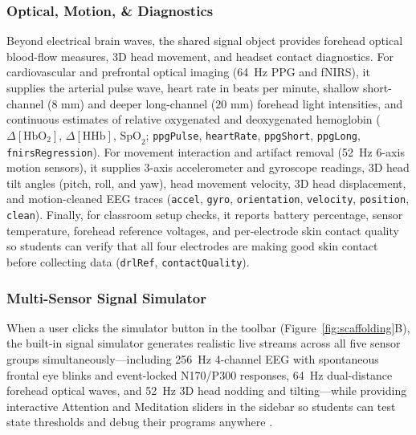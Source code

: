\documentclass[11pt]{article}
\begin{document}
\subsubsection{Optical, Motion, \& Diagnostics}
Beyond electrical brain waves, the shared signal object provides forehead optical blood-flow measures, 3D head movement, and headset contact diagnostics. For cardiovascular and prefrontal optical imaging (64~Hz PPG and fNIRS), it supplies the arterial pulse wave, heart rate in beats per minute, shallow short-channel ($8\text{ mm}$) and deeper long-channel ($20\text{ mm}$) forehead light intensities, and continuous estimates of relative oxygenated and deoxygenated hemoglobin ($\Delta[\text{HbO}_2]$, $\Delta[\text{HHb}]$, $\text{SpO}_2$; \texttt{ppgPulse}, \texttt{heartRate}, \texttt{ppgShort}, \texttt{ppgLong}, \texttt{fnirsRegression}). For movement interaction and artifact removal (52~Hz 6-axis motion sensors), it supplies 3-axis accelerometer and gyroscope readings, 3D head tilt angles (pitch, roll, and yaw), head movement velocity, 3D head displacement, and motion-cleaned EEG traces (\texttt{accel}, \texttt{gyro}, \texttt{orientation}, \texttt{velocity}, \texttt{position}, \texttt{clean}). Finally, for classroom setup checks, it reports battery percentage, sensor temperature, forehead reference voltages, and per-electrode skin contact quality so students can verify that all four electrodes are making good skin contact before collecting data (\texttt{drlRef}, \texttt{contactQuality}).

\subsubsection{Multi-Sensor Signal Simulator}
When a user clicks the simulator button in the toolbar (Figure~\ref{fig:scaffolding}B), the built-in signal simulator generates realistic live streams across all five sensor groups simultaneously---including 256~Hz 4-channel EEG with spontaneous frontal eye blinks and event-locked N170/P300 responses, 64~Hz dual-distance forehead optical waves, and 52~Hz 3D head nodding and tilting---while providing interactive Attention and Meditation sliders in the sidebar so students can test state thresholds and debug their programs anywhere \citep{deleeuw2023simulating}.
\end{document}
